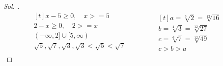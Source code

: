 \documentclass{article}
\theoremstyle{mytheoremstyle}
\theoremstyle{mytheoremstyle}
\theoremstyle{myproblemstyle}
\begin{document}
\begin{problem}[$ x, y \in {R} $, $ y = \sqrt{x - 5} + \sqrt{2 - x} $ ise $ x $ hangi aralıkta değer alır?]
\end{problem}

\begin{proof}[\textit{ Sol. }]
  \begin{equation*}
    \begin{aligned}[t]
      x -5 \ge 0,\quad x >= 5\\
      2 -x \ge 0,\quad 2 >= x\\
      (-\infty, 2] \cup [5, \infty)\\
      \sqrt{5}, \sqrt{7}, \sqrt{3}, \sqrt{3} < \sqrt{5} < \sqrt{7}\\
    \end{aligned}
    \qquad\qquad
    \begin{aligned}[t]
      a = \sqrt[3]{2} = \sqrt[12]{16}\\
      b = \sqrt[4]{3} = \sqrt[12]{27}\\
      c = \sqrt[6]{7} = \sqrt[12]{49}\\
      c > b > a
    \end{aligned}
  \end{equation*}
\end{proof}
\end{document}
